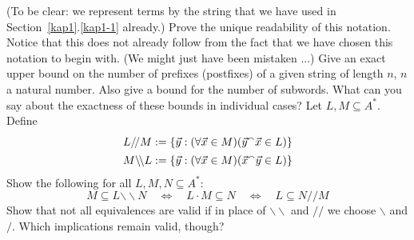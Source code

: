 (To be clear: we represent terms by the string that we have
used in Section~\ref{kap1}.\ref{kap1-1} already.) Prove the unique
readability of this notation. Notice that this does not already
follow from the fact that we have chosen this notation to
begin with. (We might just have been mistaken ...)
\vplatz
\exercise
Give an exact upper bound on the number of prefixes (postfixes)
of a given string of length $n$, $n$ a natural number. Also give
a bound for the number of subwords. What can you say about the
exactness of these bounds in individual cases?
\vplatz
\exercise
\label{ex:kuerzdef}
Let $L, M \subseteq A^{\ast}$. Define
\begin{subequations}
\begin{align}
L {/\! /} M & :=
\{\vec{y} : (\forall \vec{x} \in M)(\vec{y} {^{\smallfrown}} \vec{x} \in L)\} \\
M {\backslash\!\backslash} L & :=
\{\vec{y} : (\forall \vec{x} \in M)(\vec{x} {^{\smallfrown}} \vec{y} \in L)\}
\end{align}
\end{subequations}
Show the following for all $L, M, N \subseteq A^{\ast}$:
\begin{equation}
M \subseteq L {\backslash\!\backslash} N
\quad\Leftrightarrow\quad
L \cdot M \subseteq N
\quad\Leftrightarrow\quad
L \subseteq N {/\! /} M
\end{equation}
\vplatz
\exercise
Show that not all equivalences are valid if  in place of
${\backslash\! \backslash}$ and ${/\! /}$ we choose
$\backslash$ and $/$. Which implications remain valid, though?
